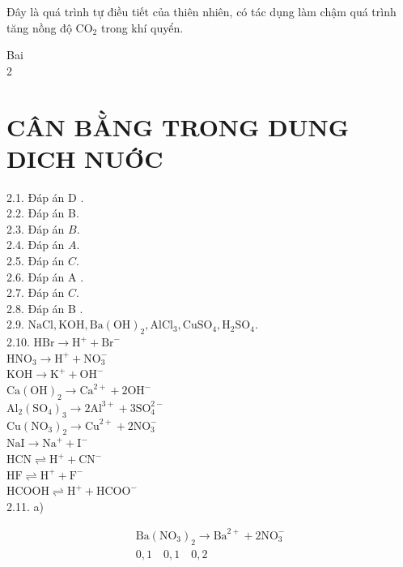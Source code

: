 \documentclass[10pt]{article}
\begin{document}
Đây là quá trình tự điều tiết của thiên nhiên, có tác dụng làm chậm quá trình tăng nồng độ $\mathrm{CO}_{2}$ trong khí quyển.

Bai\\
2

\section*{CÂN BẰNG TRONG DUNG DICH NUỚC}
2.1. Đáp án D .\\
2.2. Đáp án B.\\
2.3. Đáp án $B$.\\
2.4. Đáp án $A$.\\
2.5. Đáp án $C$.\\
2.6. Đáp án A .\\
2.7. Đáp án $C$.\\
2.8. Đáp án B .\\
2.9. $\mathrm{NaCl}, \mathrm{KOH}, \mathrm{Ba}(\mathrm{OH})_{2}, \mathrm{AlCl}_{3}, \mathrm{CuSO}_{4}, \mathrm{H}_{2} \mathrm{SO}_{4}$.\\
2.10. $\mathrm{HBr} \rightarrow \mathrm{H}^{+}+\mathrm{Br}^{-}$\\
$\mathrm{HNO}_{3} \rightarrow \mathrm{H}^{+}+\mathrm{NO}_{3}^{-}$\\
$\mathrm{KOH} \rightarrow \mathrm{K}^{+}+\mathrm{OH}^{-}$\\
$\mathrm{Ca}(\mathrm{OH})_{2} \rightarrow \mathrm{Ca}^{2+}+2 \mathrm{OH}^{-}$\\
$\mathrm{Al}_{2}\left(\mathrm{SO}_{4}\right)_{3} \rightarrow 2 \mathrm{Al}^{3+}+3 \mathrm{SO}_{4}^{2-}$\\
$\mathrm{Cu}\left(\mathrm{NO}_{3}\right)_{2} \rightarrow \mathrm{Cu}^{2+}+2 \mathrm{NO}_{3}^{-}$\\
$\mathrm{NaI} \rightarrow \mathrm{Na}^{+}+\mathrm{I}^{-}$\\
$\mathrm{HCN} \rightleftharpoons \mathrm{H}^{+}+\mathrm{CN}^{-}$\\
$\mathrm{HF} \rightleftharpoons \mathrm{H}^{+}+\mathrm{F}^{-}$\\
$\mathrm{HCOOH} \rightleftharpoons \mathrm{H}^{+}+\mathrm{HCOO}^{-}$\\
2.11. a)


\begin{gather*}
\mathrm{Ba}\left(\mathrm{NO}_{3}\right)_{2} \rightarrow \mathrm{Ba}^{2+}+2 \mathrm{NO}_{3}^{-} \\
0,1 \quad 0,1 \quad 0,2 \tag{M}
\end{gather*}
\end{document}
